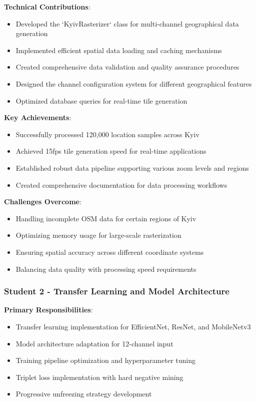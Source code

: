 \textbf{Technical Contributions}:
\begin{itemize}
    \item Developed the `KyivRasterizer` class for multi-channel geographical data generation
    \item Implemented efficient spatial data loading and caching mechanisms
    \item Created comprehensive data validation and quality assurance procedures
    \item Designed the channel configuration system for different geographical features
    \item Optimized database queries for real-time tile generation
\end{itemize}

\textbf{Key Achievements}:
\begin{itemize}
    \item Successfully processed 120,000 location samples across Kyiv
    \item Achieved 15fps tile generation speed for real-time applications
    \item Established robust data pipeline supporting various zoom levels and regions
    \item Created comprehensive documentation for data processing workflows
\end{itemize}

\textbf{Challenges Overcome}:
\begin{itemize}
    \item Handling incomplete OSM data for certain regions of Kyiv
    \item Optimizing memory usage for large-scale rasterization
    \item Ensuring spatial accuracy across different coordinate systems
    \item Balancing data quality with processing speed requirements
\end{itemize}

\subsubsection{Student 2 - Transfer Learning and Model Architecture}

\textbf{Primary Responsibilities}:
\begin{itemize}
    \item Transfer learning implementation for EfficientNet, ResNet, and MobileNetv3
    \item Model architecture adaptation for 12-channel input
    \item Training pipeline optimization and hyperparameter tuning
    \item Triplet loss implementation with hard negative mining
    \item Progressive unfreezing strategy development
\end{itemize}

